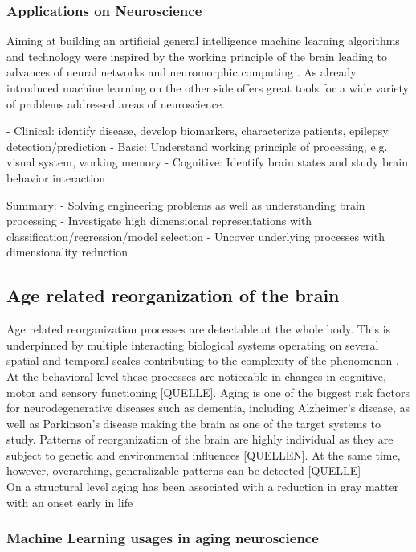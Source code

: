 \subsubsection{Applications on Neuroscience}
Aiming at building an artificial general intelligence machine learning algorithms and technology were inspired by the working principle of the brain leading to advances of neural networks \cite{Macpherson2021} and neuromorphic computing \cite{Choi2022}. As already introduced machine learning on the other side offers great tools for a wide variety of problems addressed areas of neuroscience. 

- Clinical: identify disease, develop biomarkers, characterize patients, epilepsy detection/prediction
- Basic: Understand working principle of processing, e.g. visual system, working memory
- Cognitive: Identify brain states and study brain behavior interaction

Summary: 
- Solving engineering problems as well as understanding brain processing 
- Investigate high dimensional representations with classification/regression/model selection 
- Uncover underlying processes with dimensionality reduction


\subsection{Age related reorganization of the brain}
\label{subsec:Aging}

Age related reorganization processes are detectable at the whole body. This is underpinned by multiple interacting biological systems operating on several spatial and temporal scales contributing to the complexity of the phenomenon \cite{Mooney2016}. At the behavioral level these processes are noticeable in changes in cognitive, motor and sensory functioning [QUELLE]. Aging is one of the biggest risk factors for neurodegenerative diseases such as dementia, including Alzheimer's disease, as well as Parkinson's disease making the brain as one of the target systems to study. Patterns of reorganization of the brain are highly individual as they are subject to genetic and environmental influences [QUELLEN]. At the same time, however, overarching, generalizable patterns can be detected [QUELLE]\\
On a structural level aging has been associated with a reduction in gray matter with an onset early in life 

\subsubsection{Machine Learning usages in aging neuroscience}
